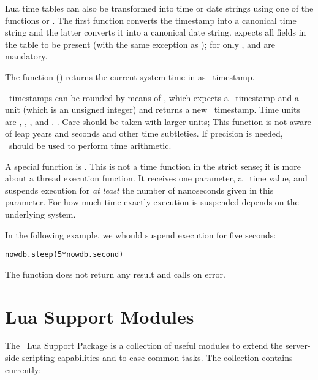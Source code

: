 Lua time tables can also be transformed into time or date
strings using one of the functions
 or
.
The first function converts the timestamp
into a canonical time string and the latter
converts it into a canonical date string.
 expects all fields in the
table to be present (with the same exception
as );
for  only ,
 and  are mandatory.

The function () returns
the current system time in 
as \nowdb\ timestamp.

\nowdb\ timestamps can be rounded by means of
, which expects a \nowdb\ time\-stamp
and a unit (which is an unsigned integer)
and returns a new \nowdb\ time\-stamp.
Time units are
,
,
,
 and
. .
Care should be taken with larger units;
This function is not aware of leap years and seconds
and other time subtleties. If precision is needed,
\sql\ should be used to perform time arithmetic.

A special function is .
This is not a time function in the strict sense;
it is more about a thread execution function.
It receives one parameter, a \nowdb\ time value,
and suspends execution for \emph{at least}
the number of nanoseconds
given in this parameter.
For how much time exactly execution is suspended
depends on the underlying system.

In the following example,
we whould suspend execution for five seconds:

\begin{lua}
\begin{lstlisting}
nowdb.sleep(5*nowdb.second)
\end{lstlisting}
\end{lua}

The function does not return any result
and calls  on error.

\clearpage
\section{Lua Support Modules}\label{sec_luasupp}
The \nowdb\ Lua Support Package is a collection
of useful modules to extend the server-side
scripting capabilities and to ease common tasks.
The collection contains currently:

